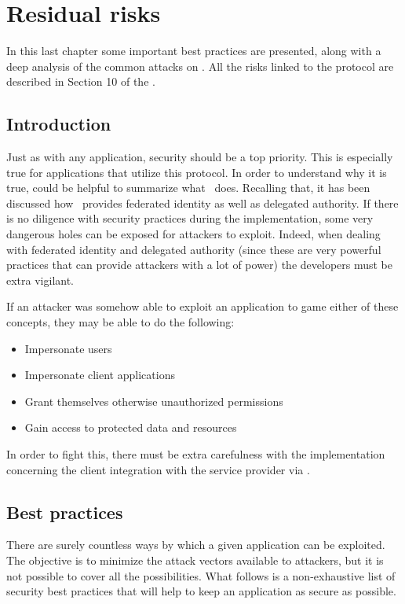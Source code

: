 
\chapter{Residual risks}
In this last chapter some important best practices are presented, along with a deep analysis of the common attacks on \textit{\oauth}. All the risks linked to the protocol are described in Section 10 of the  \cite{RFC6749}.

\minitoc

\section{Introduction}
Just as with any application, security should be a top priority. This is especially true for applications that utilize this protocol. In order to understand why it is true, could be helpful to summarize what \oauth\ does. Recalling that, it has been discussed how \oauth\ provides federated identity as well as delegated authority. If there is no diligence with security practices during the implementation, some very dangerous holes can be exposed for attackers to exploit.
Indeed, when dealing with federated identity and delegated authority (since these are very powerful practices that can provide attackers with a lot of power) the developers must be extra vigilant.

If an attacker was somehow able to exploit an application to game either of these concepts, they may be able to do the following:

\begin{itemize}
    \item Impersonate users
    \item Impersonate client applications
    \item Grant themselves otherwise unauthorized permissions
    \item Gain access to protected data and resources
\end{itemize}

In order to fight this, there must be extra carefulness with the implementation concerning the client integration with the service provider via \oauth. 

\section{Best practices}
There are surely countless ways by which a given application can be exploited. The objective is to minimize the attack vectors available to attackers, but it is not possible to cover all the possibilities. What follows is a non-exhaustive list of security best practices that will help to keep an application as secure as possible. 


